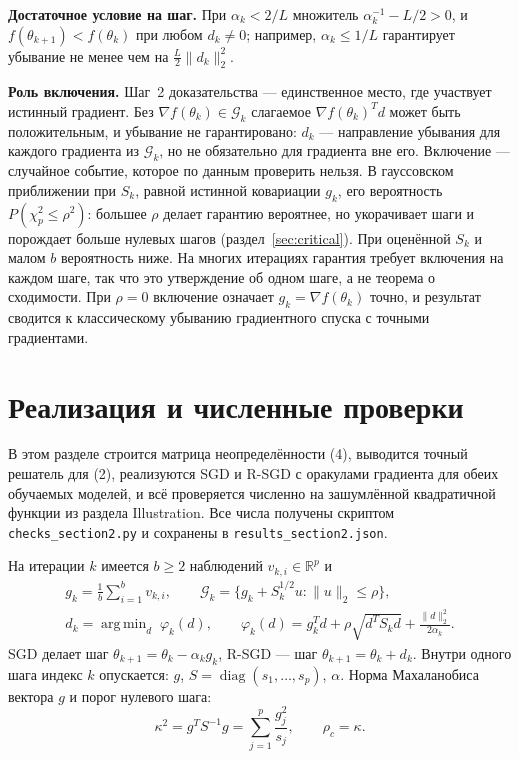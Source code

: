 \documentclass[11pt,a4paper]{article}
\newcommand{\G}{\mathcal{G}_k}
\newcommand{\norm}[1]{\lVert #1\rVert_2}
\DeclareMathOperator*{\argmin}{arg\,min}
\DeclareMathOperator{\diag}{diag}
\begin{document}
\textbf{Достаточное условие на шаг.} При $\alpha_k<2/L$ множитель $\alpha_k^{-1}-L/2>0$, и
$f(\theta_{k+1})<f(\theta_k)$ при любом $d_k\ne0$; например, $\alpha_k\le1/L$ гарантирует убывание не
менее чем на $\tfrac L2\norm{d_k}^2$.

\textbf{Роль включения.} Шаг~2 доказательства — единственное место, где участвует истинный
градиент. Без $\nabla f(\theta_k)\in\G$ слагаемое $\nabla f(\theta_k)^Td$ может быть положительным, и
убывание не гарантировано: $d_k$ — направление убывания для каждого градиента из $\G$, но не
обязательно для градиента вне его. Включение — случайное событие, которое по данным проверить нельзя.
В гауссовском приближении при $S_k$, равной истинной ковариации $g_k$, его вероятность
$P(\chi^2_p\le\rho^2)$: большее $\rho$ делает гарантию вероятнее, но укорачивает шаги и порождает
больше нулевых шагов (раздел~\ref{sec:critical}). При оценённой $S_k$ и малом $b$ вероятность ниже.
На многих итерациях гарантия требует включения на каждом шаге, так что это утверждение об одном
шаге, а не теорема о сходимости. При $\rho=0$ включение означает $g_k=\nabla f(\theta_k)$ точно, и
результат сводится к классическому убыванию градиентного спуска с точными градиентами.


\section{Реализация и численные проверки}\label{sec:impl}

В этом разделе строится матрица неопределённости (4), выводится точный решатель для (2),
реализуются SGD и R-SGD с оракулами градиента для обеих обучаемых моделей, и всё проверяется
численно на зашумлённой квадратичной функции из раздела Illustration. Все числа получены скриптом
\texttt{checks\_section2.py} и сохранены в \texttt{results\_section2.json}.


На итерации $k$ имеется $b\ge2$ наблюдений $v_{k,i}\in\mathbb R^p$ и
\begin{gather*}
g_k=\frac1b\sum_{i=1}^b v_{k,i},\qquad
\G=\{g_k+S_k^{1/2}u:\norm{u}\le\rho\},\\
d_k=\argmin_d\;\varphi_k(d),\qquad
\varphi_k(d)=g_k^Td+\rho\sqrt{d^TS_kd}+\frac{\norm{d}^2}{2\alpha_k}.
\end{gather*}
SGD делает шаг $\theta_{k+1}=\theta_k-\alpha_kg_k$, R-SGD — шаг
$\theta_{k+1}=\theta_k+d_k$. Внутри одного шага индекс $k$ опускается: $g$,
$S=\diag(s_1,\dots,s_p)$, $\alpha$. Норма Махаланобиса вектора $g$ и порог нулевого
шага:
\begin{equation*}
\kappa^2=g^TS^{-1}g=\sum_{j=1}^p\frac{g_j^2}{s_j},\qquad \rho_c=\kappa .
\end{equation*}
\end{document}
